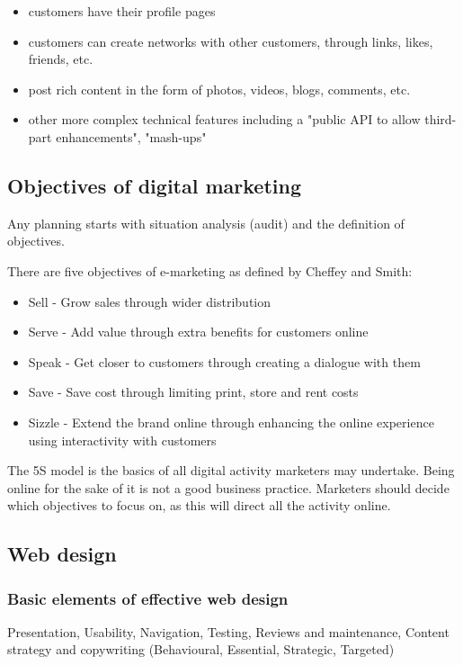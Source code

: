 \documentclass{article}
\begin{document}
\begin{itemize}
    \item customers have their profile pages
    \item customers can create networks with other customers, through links, likes, friends, etc.
    \item post rich content in the form of photos, videos, blogs, comments, etc.
    \item other more complex technical features including a "public API to allow third-part enhancements", "mash-ups"
\end{itemize}

\subsection{Objectives of digital marketing}
Any planning starts with situation analysis (audit) and the definition of objectives.

There are five objectives of e-marketing as defined by Cheffey and Smith:
\begin{itemize}
    \item Sell - Grow sales through wider distribution
    \item Serve - Add value through extra benefits for customers online
    \item Speak - Get closer to customers through creating a dialogue with them
    \item Save - Save cost through limiting print, store and rent costs
    \item Sizzle - Extend the brand online through enhancing the online experience using interactivity with customers
\end{itemize}

The 5S model is the basics of all digital activity marketers may undertake. Being online for the sake of it is not a good business practice. Marketers should decide which objectives to focus on, as this will direct all the activity online. 

\subsection{Web design}
\subsubsection{Basic elements of effective web design}
Presentation, Usability, Navigation, Testing, Reviews and maintenance, Content strategy and copywriting (Behavioural, Essential, Strategic, Targeted)
\end{document}
